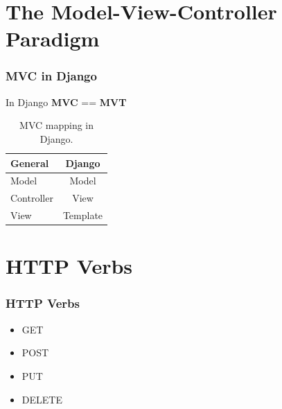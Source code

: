 \documentclass[10pt,t,xcolor=dvipsnames]{beamer}
\begin{document}
\section{The Model-View-Controller Paradigm}
\begin{frame}
\frametitle{MVC in Django}
\pause
\centering
In Django \textbf{MVC} == \textbf{\alert{MVT}}
\begin{table}
\large
\centering
\begin{tabular}{|l|c|}\hline
\textbf{General}  &\textbf{Django}\\ \hline\hline
Model&Model\\ \hline
Controller&View\\ \hline
View&Template\\ \hline
\end{tabular}
\caption{\footnotesize MVC mapping in Django.}
\end{table}
\end{frame}
\section{HTTP Verbs}
\begin{frame}
\frametitle{HTTP Verbs}
\pause
\begin{itemize}[<+->]
\item GET
\item POST
\item PUT
\item DELETE
\end{itemize}
\end{frame}
\end{document}
